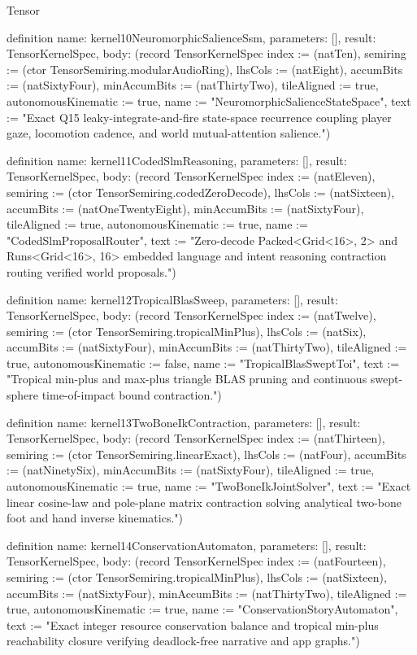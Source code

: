 \begin{lexlean}{Tensor}
\begin{semanticmodule}
definition{
  name: kernel10NeuromorphicSalienceSsm,
  parameters: [],
  result: TensorKernelSpec,
  body: (record TensorKernelSpec {index := (natTen), semiring := (ctor TensorSemiring.modularAudioRing), lhsCols := (natEight), accumBits := (natSixtyFour), minAccumBits := (natThirtyTwo), tileAligned := true, autonomousKinematic := true, name := "NeuromorphicSalienceStateSpace", text := "Exact Q15 leaky-integrate-and-fire state-space recurrence coupling player gaze, locomotion cadence, and world mutual-attention salience."})
}

definition{
  name: kernel11CodedSlmReasoning,
  parameters: [],
  result: TensorKernelSpec,
  body: (record TensorKernelSpec {index := (natEleven), semiring := (ctor TensorSemiring.codedZeroDecode), lhsCols := (natSixteen), accumBits := (natOneTwentyEight), minAccumBits := (natSixtyFour), tileAligned := true, autonomousKinematic := true, name := "CodedSlmProposalRouter", text := "Zero-decode Packed<Grid<16>, 2> and Runs<Grid<16>, 16> embedded language and intent reasoning contraction routing verified world proposals."})
}

definition{
  name: kernel12TropicalBlasSweep,
  parameters: [],
  result: TensorKernelSpec,
  body: (record TensorKernelSpec {index := (natTwelve), semiring := (ctor TensorSemiring.tropicalMinPlus), lhsCols := (natSix), accumBits := (natSixtyFour), minAccumBits := (natThirtyTwo), tileAligned := true, autonomousKinematic := false, name := "TropicalBlasSweptToi", text := "Tropical min-plus and max-plus triangle BLAS pruning and continuous swept-sphere time-of-impact bound contraction."})
}

definition{
  name: kernel13TwoBoneIkContraction,
  parameters: [],
  result: TensorKernelSpec,
  body: (record TensorKernelSpec {index := (natThirteen), semiring := (ctor TensorSemiring.linearExact), lhsCols := (natFour), accumBits := (natNinetySix), minAccumBits := (natSixtyFour), tileAligned := true, autonomousKinematic := true, name := "TwoBoneIkJointSolver", text := "Exact linear cosine-law and pole-plane matrix contraction solving analytical two-bone foot and hand inverse kinematics."})
}

definition{
  name: kernel14ConservationAutomaton,
  parameters: [],
  result: TensorKernelSpec,
  body: (record TensorKernelSpec {index := (natFourteen), semiring := (ctor TensorSemiring.tropicalMinPlus), lhsCols := (natSixteen), accumBits := (natSixtyFour), minAccumBits := (natThirtyTwo), tileAligned := true, autonomousKinematic := true, name := "ConservationStoryAutomaton", text := "Exact integer resource conservation balance and tropical min-plus reachability closure verifying deadlock-free narrative and app graphs."})
}


\end{semanticmodule}
\end{lexlean}
